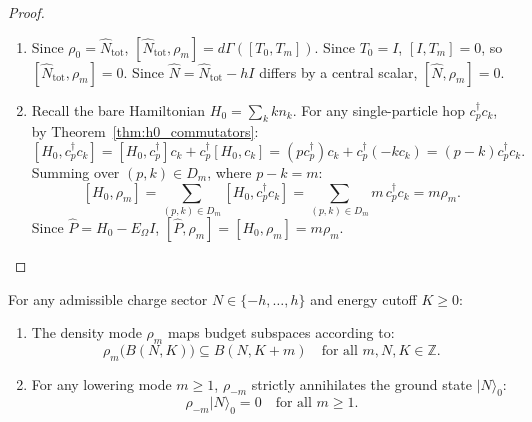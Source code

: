 \begin{proof}
\begin{enumerate}
    \item Since $\rho_0 = \hat{N}_{\mathrm{tot}}$, $[\hat{N}_{\mathrm{tot}}, \rho_m] = d\Gamma([T_0, T_m])$. Since $T_0 = I$, $[I, T_m] = 0$, so $[\hat{N}_{\mathrm{tot}}, \rho_m] = 0$. Since $\hat{N} = \hat{N}_{\mathrm{tot}} - h I$ differs by a central scalar, $[\hat{N}, \rho_m] = 0$.
    \item Recall the bare Hamiltonian $H_0 = \sum_{k} k n_k$. For any single-particle hop $c_p^\dagger c_k$, by Theorem~\ref{thm:h0_commutators}:
    \[
    [H_0, c_p^\dagger c_k] = [H_0, c_p^\dagger] c_k + c_p^\dagger [H_0, c_k] = (p c_p^\dagger) c_k + c_p^\dagger (-k c_k) = (p - k) c_p^\dagger c_k.
    \]
    Summing over $(p, k) \in D_m$, where $p - k = m$:
    \[
    [H_0, \rho_m] = \sum_{(p, k) \in D_m} [H_0, c_p^\dagger c_k] = \sum_{(p, k) \in D_m} m\, c_p^\dagger c_k = m \rho_m.
    \]
    Since $\hat{P} = H_0 - E_\Omega I$, $[\hat{P}, \rho_m] = [H_0, \rho_m] = m \rho_m$.
\end{enumerate}
\end{proof}

\begin{theorem}
\label{thm:budget_action_annihilation}
For any admissible charge sector $N \in \{-h, \dots, h\}$ and energy cutoff $K \ge 0$:
\begin{enumerate}
    \item The density mode $\rho_m$ maps budget subspaces according to:
    \begin{equation}
    \rho_m\big( B(N, K) \big) \subseteq B(N, K + m) \quad \text{for all } m, N, K \in \mathbb{Z}.
    \end{equation}
    \item For any lowering mode $m \ge 1$, $\rho_{-m}$ strictly annihilates the ground state $|N\rangle_0$:
    \begin{equation}
    \rho_{-m} |N\rangle_0 = 0 \quad \text{for all } m \ge 1.
    \end{equation}
\end{enumerate}
\end{theorem}

